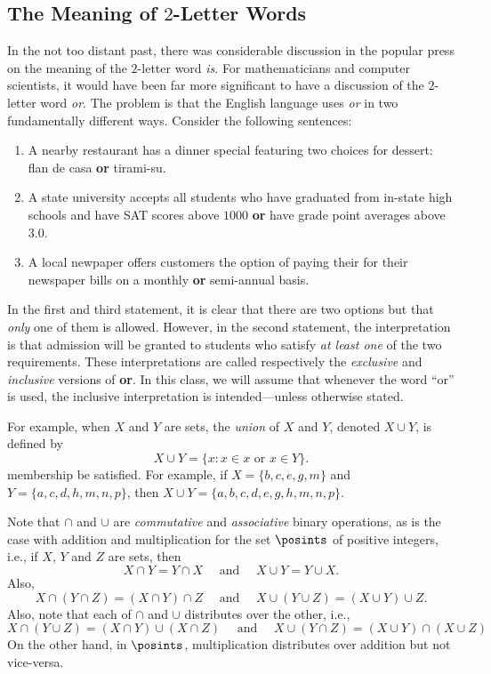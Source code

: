 \subsection{The Meaning of $2$-Letter Words}

In the not too distant past, there was considerable discussion
in the popular press on the meaning of the $2$-letter word \textit{is}.
For mathematicians and computer scientists, it would have
been far more significant to have a discussion of the $2$-letter
word \textit{or}.  The problem is that the English language uses
\textit{or} in two fundamentally different ways. Consider the
following sentences:

\begin{enumerate}
\item  A nearby restaurant has a dinner special featuring two choices for
dessert: flan de casa \textbf{or} tirami-su.
\item  A state university accepts all students who have graduated
from in-state high schools and have SAT scores above $1000$ \textbf{or} 
have grade point averages above $3.0$.
\item A local newpaper offers 
customers the option of paying their for their newspaper bills on a monthly
\textbf{or} semi-annual basis.
\end{enumerate}
In the first and third statement, it is clear that there are
two options but that \textit{only} one of them is allowed.  However,
in the second statement, the interpretation is that admission will
be granted to students who satisfy \textit{at least one} of the
two requirements.  These interpretations are called 
respectively the \textit{exclusive}
and \textit{inclusive} versions of \textbf{or}.  In this class, we
will assume that whenever the word ``or'' is used, 
the inclusive interpretation is intended---unless otherwise
stated.

For example, when $X$ and $Y$ are sets, the \textit{union}
of $X$ and $Y$, denoted $X\cup Y$, is defined by
\[
X\cup Y = \{x: x\in x \text{ or } x\in Y\}.
\]
membership be satisfied.  For example, if $X=\{b,c,e,g,m\}$
and $Y=\{a,c,d,h,m,n,p\}$, then $X\cup Y=\{a,b,c,d,e,g,h,m,n,p\}$.

Note that $\cap$ and $\cup$ are \textit{commutative} and
\textit{associative} binary operations, as is the case with
addition and multiplication for the set $\posints$ of positive
integers, i.e., if $X$, $Y$ and $Z$ are sets, then
\[
X\cap Y = Y\cap X \quad\text{ and }\quad X\cup Y = Y\cup X. 
\]
Also,
\[
X\cap(Y\cap Z)= (X\cap Y)\cap Z\quad\text{ and }\quad
X\cup(Y\cup Z)= (X\cup Y)\cup Z.
\]
Also, note that each of $\cap$ and $\cup$ distributes
over the other, i.e., 
\[
X\cap(Y\cup Z)= (X\cap Y)\cup (X\cap Z)\quad\text{ and }\quad
X\cup(Y\cap Z)= (X\cup Y)\cap (X\cup Z)
\]
On the other hand, in $\posints$, multiplication distributes
over addition but not vice-versa.

